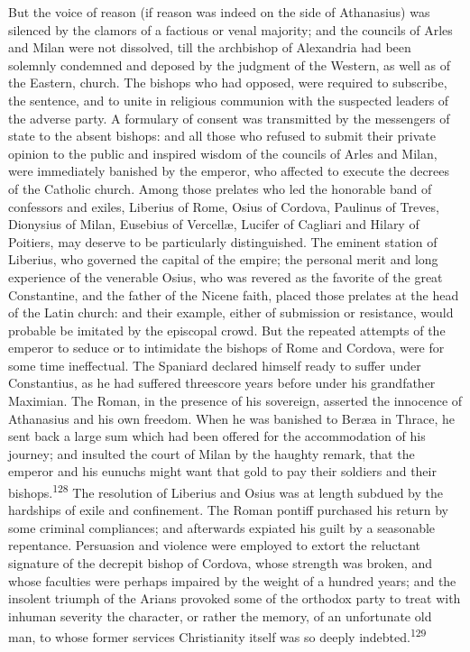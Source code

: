 

But the voice of reason (if reason was indeed on the side of
Athanasius) was silenced by the clamors of a factious or venal
majority; and the councils of Arles and Milan were not dissolved,
till the archbishop of Alexandria had been solemnly condemned and
deposed by the judgment of the Western, as well as of the
Eastern, church. The bishops who had opposed, were required to
subscribe, the sentence, and to unite in religious communion with
the suspected leaders of the adverse party. A formulary of
consent was transmitted by the messengers of state to the absent
bishops: and all those who refused to submit their private
opinion to the public and inspired wisdom of the councils of
Arles and Milan, were immediately banished by the emperor, who
affected to execute the decrees of the Catholic church. Among
those prelates who led the honorable band of confessors and
exiles, Liberius of Rome, Osius of Cordova, Paulinus of Treves,
Dionysius of Milan, Eusebius of Vercellæ, Lucifer of Cagliari and
Hilary of Poitiers, may deserve to be particularly distinguished.
The eminent station of Liberius, who governed the capital of the
empire; the personal merit and long experience of the venerable
Osius, who was revered as the favorite of the great Constantine,
and the father of the Nicene faith, placed those prelates at the
head of the Latin church: and their example, either of submission
or resistance, would probable be imitated by the episcopal crowd.
But the repeated attempts of the emperor to seduce or to
intimidate the bishops of Rome and Cordova, were for some time
ineffectual. The Spaniard declared himself ready to suffer under
Constantius, as he had suffered threescore years before under his
grandfather Maximian. The Roman, in the presence of his
sovereign, asserted the innocence of Athanasius and his own
freedom. When he was banished to Beræa in Thrace, he sent back a
large sum which had been offered for the accommodation of his
journey; and insulted the court of Milan by the haughty remark,
that the emperor and his eunuchs might want that gold to pay
their soldiers and their bishops.\textsuperscript{128} The resolution of Liberius
and Osius was at length subdued by the hardships of exile and
confinement. The Roman pontiff purchased his return by some
criminal compliances; and afterwards expiated his guilt by a
seasonable repentance. Persuasion and violence were employed to
extort the reluctant signature of the decrepit bishop of Cordova,
whose strength was broken, and whose faculties were perhaps
impaired by the weight of a hundred years; and the insolent
triumph of the Arians provoked some of the orthodox party to
treat with inhuman severity the character, or rather the memory,
of an unfortunate old man, to whose former services Christianity
itself was so deeply indebted.\textsuperscript{129}

